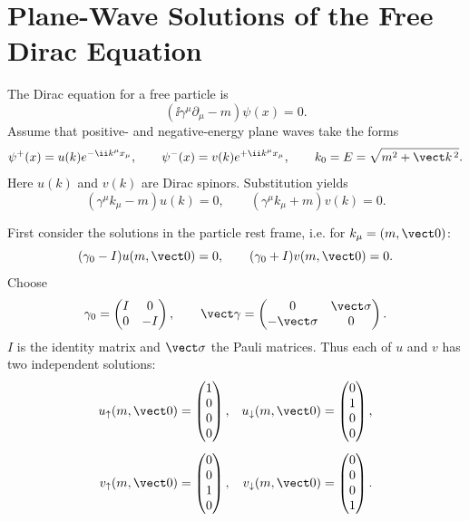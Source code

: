 \section{Plane-Wave Solutions of the Free Dirac Equation}
The Dirac equation for a free particle is
\[
(\ii\gamma^\mu\partial_\mu-m)\psi(x)=0.
\]
Assume that positive- and negative-energy plane waves take the forms
\[
\psi^+(x)=u(k)e^{-\ii k^\mu x_\mu},\qquad
\psi^-(x)=v(k)e^{+\ii k^\mu x_\mu},\qquad
k_0=E=\sqrt{m^2+\vect k^{\,2}}.
\]
Here $u(k)$ and $v(k)$ are Dirac spinors. Substitution yields
\[
(\gamma^\mu k_\mu-m)u(k)=0,\qquad
(\gamma^\mu k_\mu+m)v(k)=0.
\]

First consider the solutions in the particle rest frame, i.e. for $k_\mu=(m,\vect0)$:
\[
(\gamma_0-I)u(m,\vect0)=0,\qquad
(\gamma_0+I)v(m,\vect0)=0.
\]
Choose
\[
\gamma_0=\begin{pmatrix}I&0\\0&-I\end{pmatrix},\qquad
\vect\gamma=\begin{pmatrix}0&\vect\sigma\\-\vect\sigma&0\end{pmatrix}.
\]
$I$ is the identity matrix and $\vect\sigma$ the Pauli matrices. Thus each of $u$ and $v$ has two independent solutions:
\[
\begin{aligned}
u_\uparrow(m,\vect0)&=\begin{pmatrix}1\\0\\0\\0\end{pmatrix},&
u_\downarrow(m,\vect0)&=\begin{pmatrix}0\\1\\0\\0\end{pmatrix},\\[5pt]
v_\uparrow(m,\vect0)&=\begin{pmatrix}0\\0\\1\\0\end{pmatrix},&
v_\downarrow(m,\vect0)&=\begin{pmatrix}0\\0\\0\\1\end{pmatrix}.
\end{aligned}
\]
